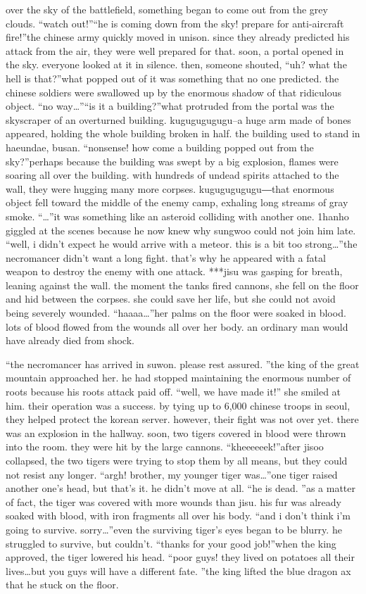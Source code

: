 over the sky of the battlefield, something began to come out from the grey clouds.
“watch out!”“he is coming down from the sky! prepare for anti-aircraft fire!”the chinese army quickly moved in unison.
 since they already predicted his attack from the air, they were well prepared for that.
soon, a portal opened in the sky.
 everyone looked at it in silence.
then, someone shouted, “uh? what the hell is that?”what popped out of it was something that no one predicted.
 the chinese soldiers were swallowed up by the enormous shadow of that ridiculous object.
“no way…”“is it a building?”what protruded from the portal was the skyscraper of an overturned building.
kugugugugugu–a huge arm made of bones appeared, holding the whole building broken in half.
the building used to stand in haeundae, busan.
“nonsense! how come a building popped out from the sky?”perhaps because the building was swept by a big explosion, flames were soaring all over the building.
 with hundreds of undead spirits attached to the wall, they were hugging many more corpses.
kugugugugugu―that enormous object fell toward the middle of the enemy camp, exhaling long streams of gray smoke.
“…”it was something like an asteroid colliding with another one.
1hanho giggled at the scenes because he now knew why sungwoo could not join him late.
“well, i didn’t expect he would arrive with a meteor.
 this is a bit too strong…”the necromancer didn’t want a long fight.
 that’s why he appeared with a fatal weapon to destroy the enemy with one attack.
***jisu was gasping for breath, leaning against the wall.
the moment the tanks fired cannons, she fell on the floor and hid between the corpses.
she could save her life, but she could not avoid being severely wounded.
“haaaa…”her palms on the floor were soaked in blood.
 lots of blood flowed from the wounds all over her body.
 an ordinary man would have already died from shock.


“the necromancer has arrived in suwon.
 please rest assured.
”the king of the great mountain approached her.
 he had stopped maintaining the enormous number of roots because his roots attack paid off.
“well, we have made it!” she smiled at him.
their operation was a success.
 by tying up to 6,000 chinese troops in seoul, they helped protect the korean server.
however, their fight was not over yet.
there was an explosion in the hallway.
 soon, two tigers covered in blood were thrown into the room.
 they were hit by the large cannons.
“kheeeeeek!”after jisoo collapsed, the two tigers were trying to stop them by all means, but they could not resist any longer.
“argh! brother, my younger tiger was…”one tiger raised another one’s head, but that’s it.
 he didn’t move at all.
“he is dead.
”as a matter of fact, the tiger was covered with more wounds than jisu.
 his fur was already soaked with blood, with iron fragments all over his body.
“and i don’t think i’m going to survive.
 sorry…”even the surviving tiger’s eyes began to be blurry.
 he struggled to survive, but couldn’t.
“thanks for your good job!”when the king approved, the tiger lowered his head.
“poor guys! they lived on potatoes all their lives…but you guys will have a different fate.
”the king lifted the blue dragon ax that he stuck on the floor.


 